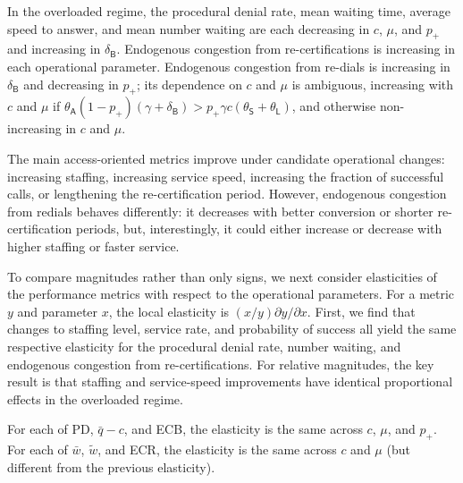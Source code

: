 \documentclass[manuscript,screen,authorversion]{acmart}
\begin{document}
\begin{corollary}
In the overloaded regime, the procedural denial rate, mean waiting time, average speed to answer, and mean number waiting are each decreasing in $c$, $\mu$, and $p_+$ and increasing in $\delta_\mathsf{B}$. Endogenous congestion from re-certifications is increasing in each operational parameter. Endogenous congestion from re-dials is increasing in $\delta_\mathsf{B}$ and decreasing in $p_+$; its dependence on $c$ and $\mu$ is ambiguous, increasing with $c$ and $\mu$ if $\theta_\mathsf{A}(1-p_+)(\gamma+\delta_\mathsf{B})>p_+\gamma c(\theta_\mathsf{S}+\theta_\mathsf{L})$, and otherwise non-increasing in $c$ and $\mu$.
\end{corollary}

The main access-oriented metrics improve under candidate operational changes: increasing staffing, increasing service speed, increasing the fraction of successful calls, or lengthening the re-certification period. However, endogenous congestion from redials behaves differently: it decreases with better conversion or shorter re-certification periods, but, interestingly, it could either increase or decrease with higher staffing or faster service. 


To compare magnitudes rather than only signs, we next consider elasticities of the performance metrics with respect to the operational parameters. For a metric $y$ and parameter $x$, the local elasticity is $(x/y)\partial y/\partial x$. First, we find that changes to staffing level, service rate, and probability of success all yield the same respective elasticity for the procedural denial rate, number waiting, and endogenous congestion from re-certifications. For relative magnitudes, the key result is that staffing and service-speed improvements have identical proportional effects in the overloaded regime.

\begin{corollary}
For each of PD, $\bar q-c$, and ECB, the elasticity is the same across $c$, $\mu$, and $p_+$. For each of $\bar w$, $\tilde w$, and ECR, the elasticity is the same across $c$ and $\mu$ (but different from the previous elasticity).
\end{corollary}
\end{document}
